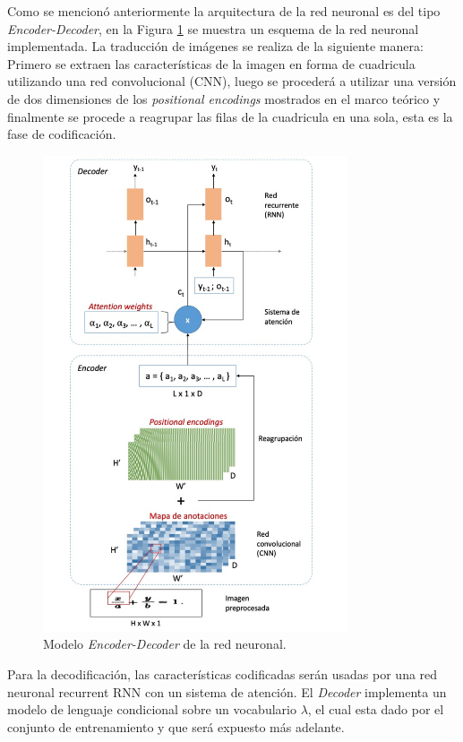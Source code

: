 Como se mencionó anteriormente la arquitectura de la red neuronal es del tipo \textit{Encoder-Decoder}, en la Figura \ref{fig:modelo} se muestra un esquema de la red neuronal implementada. La traducción de imágenes se realiza de la siguiente manera: Primero se extraen las características de la imagen en forma de cuadricula utilizando una red convolucional (CNN), luego se procederá a utilizar una versión de dos dimensiones de los \textit{positional encodings} mostrados en el marco teórico y finalmente se procede a reagrupar las filas de la cuadricula en una sola, esta es la fase de codificación. 

\begin{figure}[H]
    \centering
    \includegraphics[width=0.8\textwidth]{capitulo5/modelo/img/modelo}
    \caption{Modelo \textit{Encoder-Decoder} de la red neuronal.}
    \label{fig:modelo}
\end{figure}

Para la decodificación, las características codificadas serán usadas por una red neuronal recurrent RNN con un sistema de atención. El \textit{Decoder} implementa un modelo de lenguaje condicional sobre un vocabulario $\lambda$, el cual esta dado por el conjunto de entrenamiento y que será expuesto más adelante.

